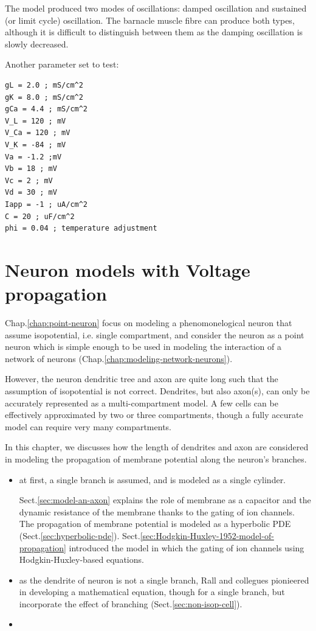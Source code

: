 The model produced two modes of oscillations: damped oscillation and
sustained (or limit cycle) oscillation. The barnacle muscle fibre can
produce both types, although it is difficult to distinguish between
them as the damping oscillation is slowly decreased. 

Another parameter set to test:
\begin{verbatim}
gL = 2.0 ; mS/cm^2
gK = 8.0 ; mS/cm^2 
gCa = 4.4 ; mS/cm^2
V_L = 120 ; mV
V_Ca = 120 ; mV
V_K = -84 ; mV
Va = -1.2 ;mV
Vb = 18 ; mV
Vc = 2 ; mV
Vd = 30 ; mV
Iapp = -1 ; uA/cm^2
C = 20 ; uF/cm^2
phi = 0.04 ; temperature adjustment
\end{verbatim}



\chapter{Neuron models with Voltage propagation}
\label{chap:neuron-models}

Chap.\ref{chap:point-neuron} focus on modeling a phenomonelogical neuron that
assume isopotential, i.e. single compartment, and consider the neuron as a point
neuron which is simple enough to be used in modeling the interaction of a
network of neurons (Chap.\ref{chap:modeling-network-neurons}).

However, the neuron dendritic tree and axon are quite long such that the
assumption of isopotential is not correct.
Dendrites, but also axon(s), can only be accurately represented as a
multi-compartment model. A few cells can be effectively approximated by two or
three compartments, though a fully accurate model can require very many
compartments.

In this chapter, we discusses how the length of dendrites and axon are
considered in modeling the propagation of membrane potential along the neuron's
branches.

\begin{itemize}
  \item at first, a single branch is assumed, and is modeled as a single
  cylinder.
  
  Sect.\ref{sec:model-an-axon} explains the role of membrane as a capacitor and
  the dynamic resistance of the membrane thanks to the gating of ion channels.
  The propagation of membrane potential is modeled as a hyperbolic PDE
  (Sect.\ref{sec:hyperbolic-pde}).
  Sect.\ref{sec:Hodgkin-Huxley-1952-model-of-propagation} introduced the model in which
  the gating of ion channels using Hodgkin-Huxley-based equations.

  \item as the dendrite of neuron is not a single branch, Rall and collegues
  pionieered in developing a mathematical equation, though for a single
  branch, but incorporate the effect of branching
  (Sect.\ref{sec:non-isop-cell}).
  

  \item 
\end{itemize}


